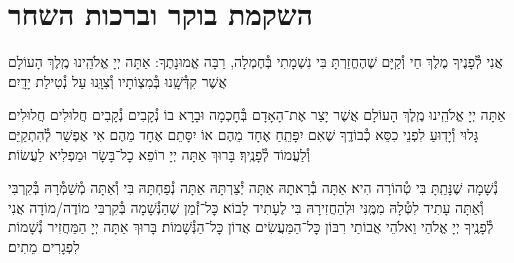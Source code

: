 \documentclass[twoside, openany, parskip=half, 11pt]{book}
\begin{document}
\renewcommand{\contentsname}{}
\tableofcontents

\clearpage



\setcounter{page}{1}

\vspace*{\fill}

\thispagestyle{empty}
\begin{Large}
\begin{center}
\end{center}
\end{Large}


\vspace*{\fill}


\centerlast

\chapter[ברכות השחר]{ השקמת בוקר וברכות השחר }

\renewcommand{\thefootnote}{\roman{footnote}} %
\setlength{\parskip}{0.75em}

\newcommand{\na}{\begin{large}
‏‍ְ
\end{large}}

אֲנִי לְ֯פָנֶיךָ מֶלֶךְ חַי וְ֯קַיָּם שֶׁהֶחֱזַרְתָּ בִּי נִשְׁמָתִי בְּ֯חֶמְלָה, רַבָּה אֱמוּנָתֶךָ:
אַתָּה יְיָ אֱלֹהֵֽינוּ מֶֽלֶךְ הָעוֹלָם אֲשֶׁר קִדְּ֯שָֽׁנוּ בְּ֯מִצְוֹתָיו וְ֯צִוָּֽנוּ עַל נְ֯טִילַת יָדָֽיִם׃

אַתָּה יְיָ אֱלֹהֵֽינוּ מֶֽלֶךְ הָעוֹלָם אֲשֶׁר יָצַר אֶת־הָאָדָם בְּ֯חׇכְמָה וּבָרָא בוֹ נְ֯קָבִים נְ֯קָבִים חֲלוּלִים חֲלוּלִים׃ גָּלוּי וְ֯יָדֽוּעַ לִפְנֵי כִסֵּא כְ֯בוֹדֶֽךָ שֶׁאִם יִפָּתֵֽחַ אֶחָד מֵהֶם אוֹ יִסָּתֵם אֶחָד מֵהֶם אִי אֶפְשַׁר לְ֯הִתְקַיֵּם וְ֯לַעֲמוֹד לְ֯פָנֶֽיךָ׃ בָּרוּךְ אַתָּה יְיָ רוֹפֵא כׇל־בָּשָׂר וּמַפְלִיא לַעֲשׂוֹת׃


נְ֯שָׁמָה שֶׁנָּתַֽתָּ בִּי טְ֯הוֹרָה הִיא׃ אַתָּה בְ֯רָאתָהּ אַתָּה יְ֯צַרְתָּהּ אַתָּה נְ֯פַחְתָּהּ בִּי וְ֯אַתָּה מְ֯שַׁמְּ֯רָהּ בְּ֯קִרְבִּי וְ֯אַתָּה עָתִיד לִטְּ֯לָהּ מִמֶּֽנִּי וּלְהַחֲזִירָהּ בִּי לֶעָתִיד לָבוֹא׃ כׇּל־זְ֯מַן שֶׁהַנְּ֯שָׁמָה בְּ֯קִרְבִּי מוֹדֶה/מוֹדָה אֲנִי לְ֯פָנֶֽיךָ יְיָ אֱלֹהַי וֵאלֹהֵי אֲבוֹתַי רִבּוֹן כׇּל־הַמַּעֲשִׂים אֲדוֹן כׇּל־הַנְּ֯שָׁמוֹת׃ בָּרוּךְ אַתָּה יְיָ הַמַּחֲזִיר נְ֯שָׁמוֹת לִפְגָרִים מֵתִים׃
\end{document}
